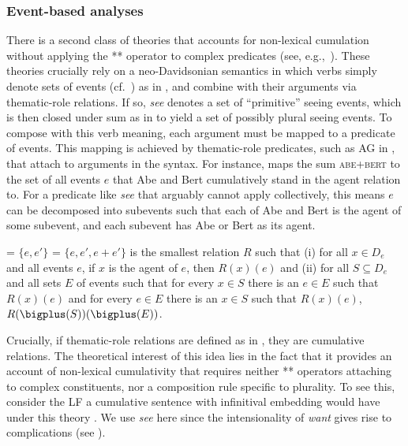 \documentclass[output=paper]{langscibook}
\begin{document}
\subsubsection{Event-based analyses}

There is a second class of theories that accounts for non-lexical cumulation without applying the ** operator to complex predicates (see, e.g.,~\citealt{Schein:1993,Landman:1996,Landman:2000,Kratzer:2003,Kratzer:2008, Ferreira:2005,Zweig:2008,Zweig:2009}). These theories crucially rely on a neo-Davidsonian semantics in which verbs simply denote sets of events (cf.~\citealt{Carlson:1984}) as in , and combine with their arguments via thematic-role relations. If so, \textit{see} denotes a set of ``primitive'' seeing events, which is then closed under sum as in  to yield a set of possibly plural seeing events. To compose with this verb meaning, each argument must be mapped to a predicate of events. This mapping is achieved by thematic-role predicates, such as AG in , that attach to arguments in the syntax. For instance,  maps the sum \textsc{abe}+\textsc{bert} to the set of all events $e$ that Abe and Bert cumulatively stand in the agent relation to. For a predicate like \textit{see} that arguably cannot apply collectively, this means $e$ can be decomposed into subevents such that each of Abe and Bert is the agent of some subevent, and each subevent has Abe or Bert as its agent. 

\ea
\ea \label{has-sch:ev1a}  = $\{e, e'\}$
\ex \label{has-sch:ev2a}  = $\{e, e', e+e'\}$
\ex \label{has-sch:ev3a}  is the smallest relation $R$ such that (i) for all $x\in D_{e}$ and all events $e$, if $x$ is the agent of $e$, then $R(x)(e)$  and (ii) for all $S \subseteq D_{e}$ and all sets $E$ of events such that for every $x \in S$ there is an $e \in E$ such that $R(x)(e)$ and for every $e \in E$ there is an $x \in S$ such that $R(x)(e) $, $R(\bigplus(S))(\bigplus(E))$.
 \z
\z

\noindent Crucially, if thematic-role relations are defined as in , they are cumulative relations. The theoretical interest of this idea lies in the fact that it provides an account of non-lexical cumulativity that requires neither ** operators attaching to complex constituents, nor a composition rule specific to plurality. To see this, consider the LF a cumulative sentence with infinitival embedding would have under this theory . We use \textit{see} here since the intensionality of \textit{want} gives rise to complications (see ).
\end{document}
